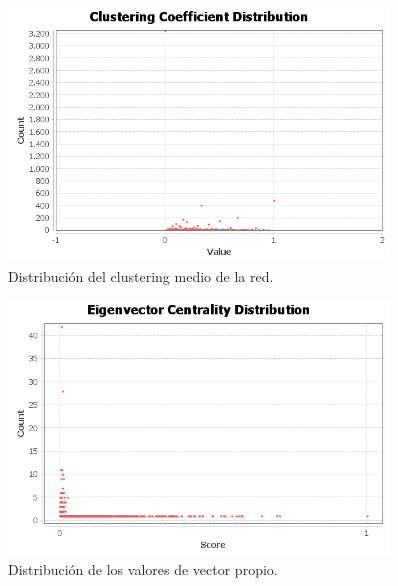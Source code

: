 \begin{figure}[ht]
    \centerfloat
    \includegraphics[width=0.9\textwidth]{img/resultados/clusteringMedio/clustering-coefficient.png}
    \caption{Distribución del clustering medio de la red.}
\end{figure}

\begin{figure}[ht]
    \centerfloat
    \includegraphics[width=0.9\textwidth]{img/resultados/vectorPropio/eigenvector-centralities.png}
    \caption{Distribución de los valores de vector propio.}
\end{figure}
